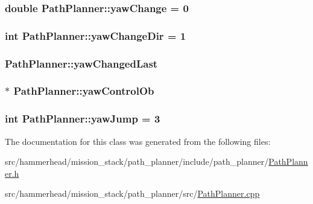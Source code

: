 \subsubsection[{\texorpdfstring{yaw\+Change}{yawChange}}]{\setlength{\rightskip}{0pt plus 5cm}double Path\+Planner\+::yaw\+Change = 0}\hypertarget{classPathPlanner_a60f7621c34683c9e3b64d89a36358c48}{}\label{classPathPlanner_a60f7621c34683c9e3b64d89a36358c48}
\subsubsection[{\texorpdfstring{yaw\+Change\+Dir}{yawChangeDir}}]{\setlength{\rightskip}{0pt plus 5cm}int Path\+Planner\+::yaw\+Change\+Dir = 1}\hypertarget{classPathPlanner_a43393934c97970d243fbb219ee8c909d}{}\label{classPathPlanner_a43393934c97970d243fbb219ee8c909d}
\subsubsection[{\texorpdfstring{yaw\+Changed\+Last}{yawChangedLast}}]{ Path\+Planner\+::yaw\+Changed\+Last}\hypertarget{classPathPlanner_af31adaae522a828711bb1c800176cbb9}{}\label{classPathPlanner_af31adaae522a828711bb1c800176cbb9}
\subsubsection[{\texorpdfstring{yaw\+Control\+Ob}{yawControlOb}}]{$\ast$ Path\+Planner\+::yaw\+Control\+Ob}\hypertarget{classPathPlanner_a8abc38307d93b4feecb14a8ece4764a6}{}\label{classPathPlanner_a8abc38307d93b4feecb14a8ece4764a6}
\subsubsection[{\texorpdfstring{yaw\+Jump}{yawJump}}]{\setlength{\rightskip}{0pt plus 5cm}int Path\+Planner\+::yaw\+Jump = 3}\hypertarget{classPathPlanner_a2312e73d3f37acf470f448afaa262afe}{}\label{classPathPlanner_a2312e73d3f37acf470f448afaa262afe}


The documentation for this class was generated from the following files\+:\begin{DoxyCompactItemize}
\item 
src/hammerhead/mission\+\_\+stack/path\+\_\+planner/include/path\+\_\+planner/\hyperlink{PathPlanner_8h}{Path\+Planner.\+h}\item 
src/hammerhead/mission\+\_\+stack/path\+\_\+planner/src/\hyperlink{PathPlanner_8cpp}{Path\+Planner.\+cpp}\end{DoxyCompactItemize}
